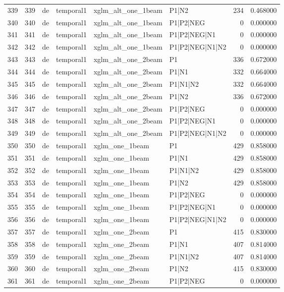 \begin{tabular}{lrllllrr}
339 & 339 & de & temporal1 & xglm_alt_one_1beam & P1|N2 & 234 & 0.468000 \\
340 & 340 & de & temporal1 & xglm_alt_one_1beam & P1|P2|NEG & 0 & 0.000000 \\
341 & 341 & de & temporal1 & xglm_alt_one_1beam & P1|P2|NEG|N1 & 0 & 0.000000 \\
342 & 342 & de & temporal1 & xglm_alt_one_1beam & P1|P2|NEG|N1|N2 & 0 & 0.000000 \\
343 & 343 & de & temporal1 & xglm_alt_one_2beam & P1 & 336 & 0.672000 \\
344 & 344 & de & temporal1 & xglm_alt_one_2beam & P1|N1 & 332 & 0.664000 \\
345 & 345 & de & temporal1 & xglm_alt_one_2beam & P1|N1|N2 & 332 & 0.664000 \\
346 & 346 & de & temporal1 & xglm_alt_one_2beam & P1|N2 & 336 & 0.672000 \\
347 & 347 & de & temporal1 & xglm_alt_one_2beam & P1|P2|NEG & 0 & 0.000000 \\
348 & 348 & de & temporal1 & xglm_alt_one_2beam & P1|P2|NEG|N1 & 0 & 0.000000 \\
349 & 349 & de & temporal1 & xglm_alt_one_2beam & P1|P2|NEG|N1|N2 & 0 & 0.000000 \\
350 & 350 & de & temporal1 & xglm_one_1beam & P1 & 429 & 0.858000 \\
351 & 351 & de & temporal1 & xglm_one_1beam & P1|N1 & 429 & 0.858000 \\
352 & 352 & de & temporal1 & xglm_one_1beam & P1|N1|N2 & 429 & 0.858000 \\
353 & 353 & de & temporal1 & xglm_one_1beam & P1|N2 & 429 & 0.858000 \\
354 & 354 & de & temporal1 & xglm_one_1beam & P1|P2|NEG & 0 & 0.000000 \\
355 & 355 & de & temporal1 & xglm_one_1beam & P1|P2|NEG|N1 & 0 & 0.000000 \\
356 & 356 & de & temporal1 & xglm_one_1beam & P1|P2|NEG|N1|N2 & 0 & 0.000000 \\
357 & 357 & de & temporal1 & xglm_one_2beam & P1 & 415 & 0.830000 \\
358 & 358 & de & temporal1 & xglm_one_2beam & P1|N1 & 407 & 0.814000 \\
359 & 359 & de & temporal1 & xglm_one_2beam & P1|N1|N2 & 407 & 0.814000 \\
360 & 360 & de & temporal1 & xglm_one_2beam & P1|N2 & 415 & 0.830000 \\
361 & 361 & de & temporal1 & xglm_one_2beam & P1|P2|NEG & 0 & 0.000000 \\

\end{tabular}
